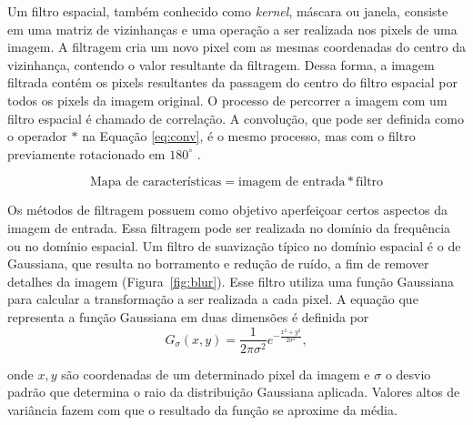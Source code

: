 \label{sec:convolucao}

Um filtro espacial, também conhecido como \textit{kernel}, máscara ou janela, consiste em uma matriz de vizinhanças e uma operação a ser realizada nos pixels de uma imagem. A filtragem cria um novo pixel com as mesmas coordenadas do centro da vizinhança, contendo o valor resultante da filtragem. Dessa forma, a imagem filtrada contém os pixels resultantes da passagem do centro do filtro espacial por todos os pixels da imagem original. O processo de percorrer a imagem com um filtro espacial é chamado de correlação. A convolução, que pode ser definida como o operador $*$ na Equação \eqref{eq:conv}, é o mesmo processo, mas com o filtro previamente rotacionado em $180^{\circ}$ \cite{Gonzalez2007}.

\begin{equation}
\text{Mapa de características} = \text{imagem de entrada} * \text{filtro}
\label{eq:conv}
\end{equation}

Os métodos de filtragem possuem como objetivo aperfeiçoar certos aspectos da imagem de entrada. Essa filtragem pode ser realizada no domínio da frequência ou no domínio espacial. Um filtro de suavização típico no domínio espacial é o de Gaussiana, que resulta no borramento e redução de ruído, a fim de remover detalhes da imagem (Figura~\ref{fig:blur}). Esse filtro utiliza uma função Gaussiana para calcular a transformação a ser realizada a cada pixel. A equação que representa a função Gaussiana em duas dimensões é definida por
\begin{equation*}
    G_{\sigma}(x,y) = \frac{1}{2\pi \sigma^2} e^{-\frac{x^2 + y^2}{2 \sigma^2}},
\label{eq:Gaussian}
\end{equation*}

\noindent onde $x,y$ são coordenadas de um determinado pixel da imagem e $\sigma$ o desvio padrão que determina o raio da distribuição Gaussiana aplicada. Valores altos de variância fazem com que o resultado da função se aproxime da média.

